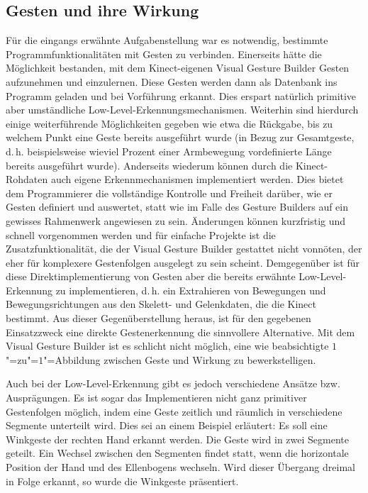 \subsection{Gesten und ihre Wirkung}\label{sec:gesten}
Für die eingangs erwähnte Aufgabenstellung war es notwendig, bestimmte Programmfunktionalitäten mit Gesten zu verbinden. Einerseits hätte die Möglichkeit bestanden, mit dem Kinect-eigenen Visual Gesture Builder Gesten aufzunehmen und einzulernen. Diese Gesten werden dann als Datenbank ins Programm geladen und bei Vorführung erkannt. Dies erspart natürlich primitive aber umständliche Low-Level-Erkennungsmechanismen. Weiterhin sind hierdurch einige weiterführende Möglichkeiten gegeben wie etwa die Rückgabe, bis zu welchem Punkt eine Geste bereits ausgeführt wurde (in Bezug zur Gesamtgeste, d.\,h. beispielsweise wieviel Prozent einer Armbewegung vordefinierte Länge bereits ausgeführt wurde). Anderseits wiederum können durch die Kinect-Rohdaten auch eigene Erkennmechanismen implementiert werden. Dies bietet dem Programmierer die vollständige Kontrolle und Freiheit darüber, wie er Gesten definiert und auswertet, statt wie im Falle des Gesture Builders auf ein gewisses Rahmenwerk angewiesen zu sein. Änderungen können kurzfristig und schnell vorgenommen werden und für einfache Projekte ist die Zusatzfunktionalität, die der Visual Gesture Builder gestattet nicht vonnöten, der eher für komplexere Gestenfolgen ausgelegt zu sein scheint. Demgegenüber ist für diese Direktimplementierung von Gesten aber die bereits erwähnte Low-Level-Erkennung zu implementieren, d.\,h. ein Extrahieren von Bewegungen und Bewegungsrichtungen aus den Skelett- und Gelenkdaten, die die Kinect bestimmt. Aus dieser Gegenüberstellung heraus, ist für den gegebenen Einsatzzweck eine direkte Gestenerkennung die sinnvollere Alternative. Mit dem Visual Gesture Builder ist es schlicht nicht möglich, eine wie beabsichtigte $1$"=zu"=$1$"=Abbildung zwischen Geste und Wirkung zu bewerkstelligen.\par 
	Auch bei der Low-Level-Erkennung gibt es jedoch verschiedene Ansätze bzw. Ausprägungen. Es ist sogar das Implementieren nicht ganz primitiver Gestenfolgen möglich, indem eine Geste zeitlich und räumlich in verschiedene Segmente unterteilt wird. Dies sei an einem Beispiel erläutert: Es soll eine Winkgeste der rechten Hand erkannt werden. Die Geste wird in zwei Segmente geteilt. Ein Wechsel zwischen den Segmenten findet statt, wenn die horizontale Position der Hand und des Ellenbogens wechseln. Wird dieser Übergang dreimal in Folge erkannt, so wurde die Winkgeste präsentiert.\par
